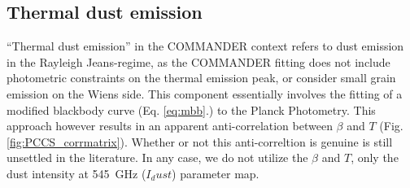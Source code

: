       \subsection{Thermal dust emission}
      ``Thermal dust emission'' in the COMMANDER context refers to dust emission in the Rayleigh Jeans-regime, as the COMMANDER fitting does not include photometric constraints on the thermal emission peak, or consider small grain emission on the Wiens side. This component essentially involves the fitting of a modified blackbody curve (Eq. \ref{eq:mbb}.) to the Planck Photometry. This approach however results in an apparent anti-correlation between $\beta$ and $T$ (Fig. \ref{fig:PCCS_corrmatrix}). Whether or not this anti-correltion is genuine is still unsettled in the literature. In any case, we do not utilize the $\beta$ and $T$, only the dust intensity at 545~GHz ($I_dust$) parameter map.

